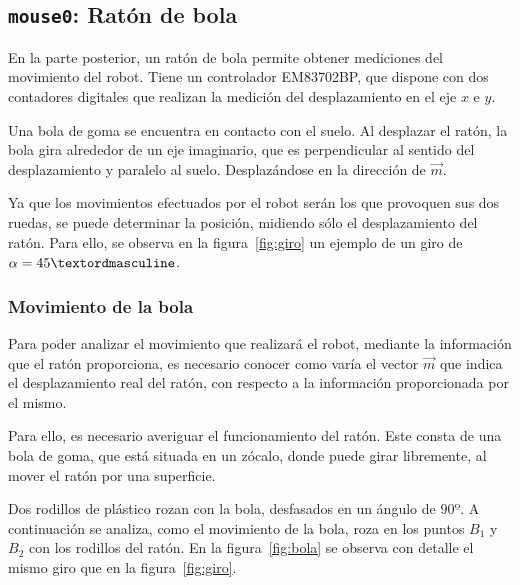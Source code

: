 \documentclass[10pt,a4paper,hidelinks,twocolumn,nobalancelastpage]{article}
\begin{document}
\clearpage
\subsection{\texttt{mouse0}: Ratón de bola}

En la parte posterior, un ratón de bola permite obtener mediciones del movimiento del
robot. Tiene un controlador EM83702BP, que dispone con dos contadores digitales que
realizan la medición del desplazamiento en el eje $x$ e $y$.

Una bola de goma se encuentra en contacto con el suelo. Al desplazar el ratón, 
la bola gira alrededor de un eje imaginario, que es perpendicular al sentido del
desplazamiento y paralelo al suelo. Desplazándose en la dirección de $\vec{m}$.

Ya que los movimientos efectuados por el robot serán los que provoquen sus dos ruedas,
se puede determinar la posición, midiendo sólo el desplazamiento del ratón. Para ello,
se observa en la figura~\ref{fig:giro} un ejemplo de un giro de $\alpha = \RobotAngleº$.


\subsubsection{Movimiento de la bola}
Para poder analizar el movimiento que realizará el robot, mediante la 
información que el ratón proporciona, es necesario conocer como varía el vector 
$\vec{m}$ que indica el desplazamiento real del ratón, con respecto a la 
información proporcionada por el mismo.

Para ello, es necesario averiguar el funcionamiento del ratón. Este consta de 
una bola de goma, que está situada en un zócalo, donde puede girar libremente, 
al mover el ratón por una superficie.

Dos rodillos de plástico rozan con la bola, desfasados en un ángulo de $90º$. A 
continuación se analiza, como el movimiento de la bola, roza en los puntos $B_1$ 
y $B_2$ con los rodillos del ratón. En la figura~\ref{fig:bola} se observa con 
detalle el mismo giro que en la figura~\ref{fig:giro}.

\end{document}
